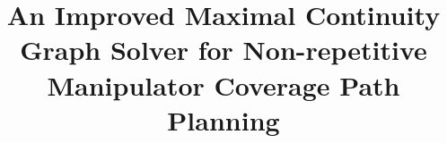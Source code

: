 \documentclass[conference]{IEEEtran}
\begin{document}
\title{An Improved Maximal Continuity Graph Solver for Non-repetitive Manipulator Coverage Path Planning}

%

\maketitle
\end{document}
